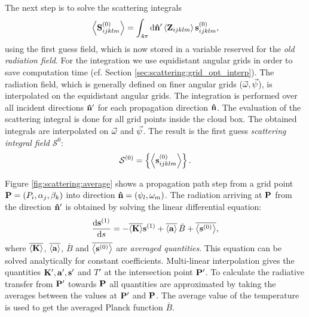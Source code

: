 The next step is to solve the scattering integrals
\begin{equation}
  \left\langle {\bf S}^{(0)}_{ijklm} \right\rangle = \int_{4\pi} \mathrm{d} {\bf \hat{n}}'
  \left\langle {\bf Z}_{ijklm} \right\rangle {\bf s}_{ijklm}^{(0)},
  \label{eq:scattering:scat-int}
\end{equation}
using the first guess field, which is now stored in a variable
reserved for the \emph{old radiation field}. For the integration we
use equidistant angular grids in order to save computation time (cf.
Section \ref{sec:scattering:grid_opt_interp}).  The radiation field, which is
generally defined on finer angular grids ($\vec{\omega},
\vec{\psi}$), is interpolated on the equidistant angular grids.
The integration is performed over all incident directions ${\bf \hat{n}}'$ for
each propagation direction ${\bf \hat{n}}$.  The evaluation of the scattering
integral is done for all grid points inside the cloud box. The
obtained integrals are interpolated on $\vec{\omega}$ and
$\vec{\psi}$.  The result is the first guess \emph{scattering
  integral field} ${\mathcal S}^{0}$:
\begin{equation}
  {\mathcal S}^{(0)} = \left\{\left\langle {\bf s}^{(0)}_{ijklm}  \right\rangle\right\}.  
\end{equation}

Figure \ref{fig:scattering:average} shows a propagation path step from a grid
point $\mathbf{P} = (P_i, \alpha_j, \beta_k)$ into direction ${\bf \hat{n}} =
(\psi_l, \omega_m)$. The radiation arriving at $\mathbf{P}$ from the
direction ${\bf \hat{n}}'$ is obtained by solving the linear
differential equation:
\begin{equation}
  \frac{\mathrm{d} {\bf s}^{(1)}}{\mathrm{d} s} =
  -\overline{\left\langle {\bf K} \right\rangle}  {\bf s}^{(1)} + \overline{\left\langle {\bf a} \right\rangle}\,  \bar{B}
  +\overline{\left\langle {\bf s}^{(0)} \right\rangle},
  \label{eq:scattering:vrte-fs-av}
\end{equation}
where $\overline{\left\langle {\bf K} \right\rangle}$, $\overline{\left\langle {\bf a} \right\rangle}$, $\bar{B}$ and $\overline{\left\langle {\bf s}^{(0)} \right\rangle} $ are \emph{averaged quantities}.  This equation
can be solved analytically for constant coefficients. Multi-linear
interpolation gives the quantities ${\bf K}', {\bf a}',
{\bf s}'$ and $T'$ at the intersection point $\mathbf{P}'$.  To calculate the radiative transfer from $\mathbf{P}'$ towards $\mathbf{P}$ all quantities are approximated by
taking the averages between the values at $\mathbf{P}'$ and $\mathbf{P}$. The average value of the temperature is used to get the
averaged Planck function $\bar{B}$.

